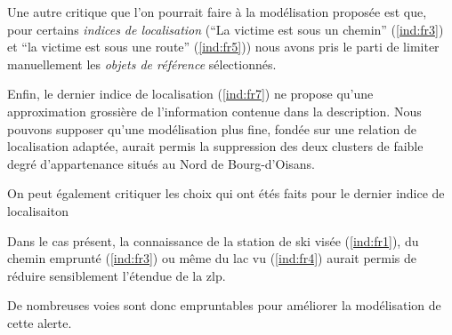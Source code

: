 Une autre critique que l'on pourrait faire à la modélisation proposée
est que, pour certains \emph{indices de localisation} (\enquote{La
  victime est sous un chemin} (\ref{ind:fr3}) et \enquote{la victime
  est sous une route} (\ref{ind:fr5})) nous avons pris le parti de
limiter manuellement les \emph{objets de référence} sélectionnés.

Enfin, le dernier indice de localisation (\ref{ind:fr7}) ne propose
qu'une approximation grossière de l'information contenue dans la
description.
%
Nous pouvons supposer qu'une modélisation plus fine, fondée sur une
relation de localisation adaptée, aurait permis la suppression des
deux clusters de faible degré d'appartenance situés au Nord de
Bourg-d'Oisans.


On peut également critiquer les choix qui ont étés faits pour le
dernier indice de localisaiton

Dans le cas présent, la connaissance de la station de ski visée
(\ref{ind:fr1}), du chemin emprunté (\ref{ind:fr3}) ou même du lac vu
(\ref{ind:fr4}) aurait permis de réduire sensiblement l'étendue de la
\ac{zlp}.

De nombreuses voies sont donc empruntables pour améliorer la
modélisation de cette alerte.

